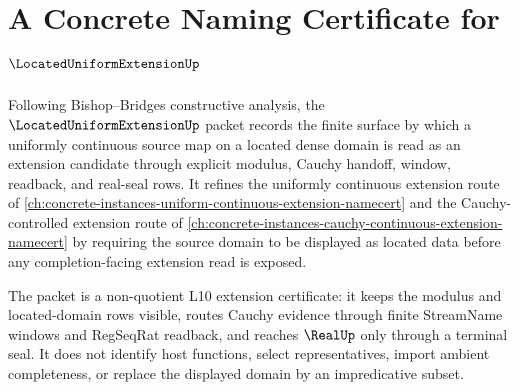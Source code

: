 \chapter{A Concrete Naming Certificate for $\LocatedUniformExtensionUp$}
\label{ch:concrete-instances-located-uniform-extension-namecert}

Following Bishop--Bridges constructive analysis, the $\LocatedUniformExtensionUp$ packet records the finite surface by which a uniformly continuous source map on a located dense domain is read as an extension candidate through explicit modulus, Cauchy handoff, window, readback, and real-seal rows. It refines the uniformly continuous extension route of \autoref{ch:concrete-instances-uniform-continuous-extension-namecert} and the Cauchy-controlled extension route of \autoref{ch:concrete-instances-cauchy-continuous-extension-namecert} by requiring the source domain to be displayed as located data before any completion-facing extension read is exposed.

The packet is a non-quotient L10 extension certificate: it keeps the modulus and located-domain rows visible, routes Cauchy evidence through finite StreamName windows and RegSeqRat readback, and reaches $\RealUp$ only through a terminal seal. It does not identify host functions, select representatives, import ambient completeness, or replace the displayed domain by an impredicative subset.

